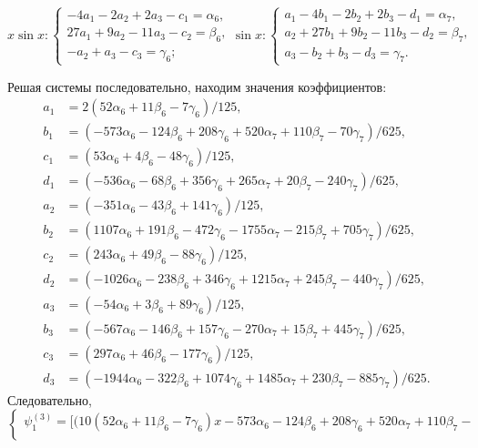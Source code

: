 \documentclass[11pt]{article}
\begin{document}
{\hspace{-1em}
$x \sin x: \begin{cases} 
-4a_1 - 2a_2 + 2a_3 - c_1 = \alpha_6, \\ 
27a_1 + 9a_2 - 11a_3 - c_2 = \beta_6, \\ 
-a_2 + a_3 - c_3 = \gamma_6; 
\end{cases}
\sin x: \begin{cases} 
a_1 - 4b_1 - 2b_2 + 2b_3 - d_1 = \alpha_7, \\ 
a_2 + 27b_1 + 9b_2 - 11b_3 - d_2 = \beta_7, \\ 
a_3 - b_2 + b_3 - d_3 = \gamma_7.
\end{cases}$

Решая системы последовательно, находим значения коэффициентов:
\begin{align*}
a_1 &= 2(52 \alpha_6 + 11 \beta_6 - 7 \gamma_6)/125, \\
b_1 &= (-573 \alpha_6 - 124 \beta_6 + 208 \gamma_6 + 520 \alpha_7 + 110 \beta_7 - 70 \gamma_7)/625, \\
c_1 &= (53 \alpha_6 + 4 \beta_6 - 48 \gamma_6)/125, \\
d_1 &= (-536 \alpha_6 - 68 \beta_6 + 356 \gamma_6 + 265 \alpha_7 + 20 \beta_7 - 240 \gamma_7)/625, \\
a_2 &= (-351 \alpha_6 - 43 \beta_6 + 141 \gamma_6)/125, \\
b_2 &= (1107 \alpha_6 + 191 \beta_6 - 472 \gamma_6 - 1755 \alpha_7 - 215 \beta_7 + 705 \gamma_7)/625, \\
c_2 &= (243 \alpha_6 + 49 \beta_6 - 88 \gamma_6)/125, \\
d_2 &= (-1026 \alpha_6 - 238 \beta_6 + 346 \gamma_6 + 1215 \alpha_7 + 245 \beta_7 - 440 \gamma_7)/625, \\
a_3 &= (-54 \alpha_6 + 3 \beta_6 + 89 \gamma_6)/125, \\
b_3 &= (-567 \alpha_6 - 146 \beta_6 + 157 \gamma_6 - 270 \alpha_7 + 15 \beta_7 + 445 \gamma_7)/625, \\
c_3 &= (297 \alpha_6 + 46 \beta_6 - 177 \gamma_6)/125, \\
d_3 &= (-1944 \alpha_6 - 322 \beta_6 + 1074 \gamma_6 + 1485 \alpha_7 + 230 \beta_7 - 885 \gamma_7)/625.
\end{align*}
Следовательно,
\begin{equation*}
\begin{cases}
\psi_1^{(3)} = \Big[ \Big( 10(52\alpha_6 + 11\beta_6 - 7\gamma_6)x - 573\alpha_6 - 124\beta_6 + 208\gamma_6 + 520\alpha_7 + 110\beta_7 - \\

\end{cases}
\end{equation*}}
\end{document}
